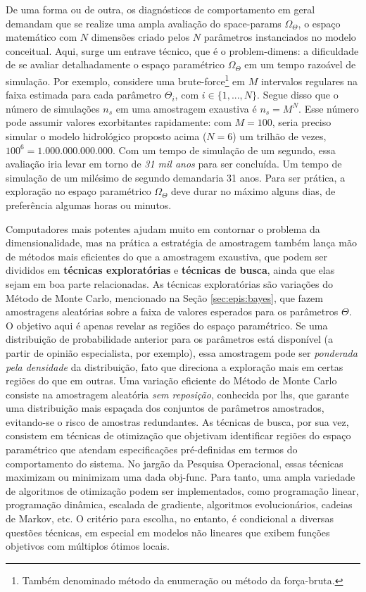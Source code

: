 \documentclass[./main.tex]{subfiles}
\begin{document}
\par De uma forma ou de outra, os diagnósticos de comportamento em geral demandam que se realize uma ampla avaliação do \gls{space-params} $\Omega_{\Theta}$, o espaço matemático com $N$ dimensões criado pelos $N$ parâmetros instanciados no modelo conceitual. Aqui, surge um entrave técnico, que é o \gls{problem-dimens}: a dificuldade de se avaliar detalhadamente o espaço paramétrico $\Omega_{\Theta}$ em um tempo razoável de simulação. Por exemplo, considere uma \gls{brute-force}\footnote{Também denominado método da enumeração ou método da força-bruta.} em $M$ intervalos regulares na faixa estimada para cada parâmetro $\Theta_i$, com $i \in \{1, ..., N\}$. Segue disso que o número de simulações $n_s$ em uma amostragem exaustiva é $n_s = M^N$. Esse número pode assumir valores exorbitantes rapidamente: com $M=100$, seria preciso simular o modelo hidrológico proposto acima ($N=6$) um trilhão de vezes, $100^6 = 1.000.000.000.000$. Com um tempo de simulação de um segundo, essa avaliação iria levar em torno de \textit{31 mil anos} para ser concluída. Um tempo de simulação de um milésimo de segundo demandaria 31 anos. Para ser prática, a exploração no espaço paramétrico $\Omega_{\Theta}$ deve durar no máximo alguns dias, de preferência algumas horas ou minutos. 

\par Computadores mais potentes ajudam muito em contornar o problema da dimensionalidade, mas na prática a estratégia de amostragem também lança mão de métodos mais eficientes do que a amostragem exaustiva, que podem ser divididos em \textbf{técnicas exploratórias} e \textbf{técnicas de busca}, ainda que elas sejam em boa parte relacionadas. As técnicas exploratórias são variações do Método de Monte Carlo, mencionado na Seção \ref{sec:epis:bayes}, que fazem amostragens aleatórias sobre a faixa de valores esperados para os parâmetros $\Theta$. O objetivo aqui é apenas revelar as regiões do espaço paramétrico. Se uma distribuição de probabilidade anterior para os parâmetros está disponível (a partir de opinião especialista, por exemplo), essa amostragem pode ser \textit{ponderada pela densidade} da distribuição, fato que direciona a exploração mais em certas regiões do que em outras. Uma variação eficiente do Método de Monte Carlo consiste na amostragem aleatória \textit{sem reposição}, conhecida por \gls{lhs}, que garante uma distribuição mais espaçada dos conjuntos de parâmetros amostrados, evitando-se o risco de amostras redundantes. As técnicas de busca, por sua vez, consistem em técnicas de otimização que objetivam identificar regiões do espaço paramétrico que atendam especificações pré-definidas em termos do comportamento do sistema. No jargão da Pesquisa Operacional, essas técnicas maximizam ou minimizam uma dada \gls{obj-func}. Para tanto, uma ampla variedade de algoritmos de otimização podem ser implementados, como programação linear, programação dinâmica, escalada de gradiente, algoritmos evolucionários, cadeias de Markov, etc. O critério para escolha, no entanto, é condicional a diversas questões técnicas, em especial em modelos não lineares que exibem funções objetivos com múltiplos ótimos locais.
\end{document}
